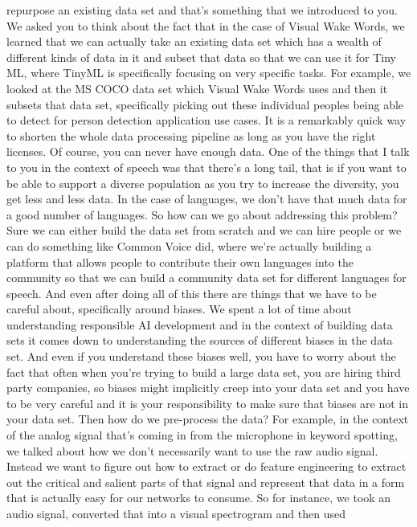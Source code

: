 repurpose an existing data set and that's
something that we introduced to you.
We asked you to think about the fact that in the case of Visual Wake Words,
we learned that we can actually take an existing data set which
has a wealth of different kinds of data in it
and subset that data so that we can use it
for Tiny ML, where TinyML is specifically
focusing on very specific tasks.
For example, we looked at the MS COCO data set which Visual Wake Words uses
and then it subsets that data set, specifically picking out
these individual peoples being able to detect for person detection application
use cases.
It is a remarkably quick way to shorten the whole data processing pipeline
as long as you have the right licenses.
Of course, you can never have enough data.
One of the things that I talk to you in the context of speech
was that there's a long tail, that is if you
want to be able to support a diverse population as you
try to increase the diversity, you get less and less data.
In the case of languages, we don't have that much data
for a good number of languages.
So how can we go about addressing this problem?
Sure we can either build the data set from scratch and we can hire people
or we can do something like Common Voice did, where we're actually
building a platform that allows people to contribute
their own languages into the community so
that we can build a community data set for different languages for speech.
And even after doing all of this there are
things that we have to be careful about, specifically around biases.
We spent a lot of time about understanding responsible AI
development and in the context of building
data sets it comes down to understanding the sources of different biases
in the data set.
And even if you understand these biases well, you have to worry about the fact
that often when you're trying to build a large data set,
you are hiring third party companies, so biases might implicitly
creep into your data set and you have to be very careful
and it is your responsibility to make sure that biases are not in your data
set.
Then how do we pre-process the data?
For example, in the context of the analog signal that's
coming in from the microphone in keyword spotting,
we talked about how we don't necessarily want to use the raw audio signal.
Instead we want to figure out how to extract or do feature engineering
to extract out the critical and salient parts of that signal
and represent that data in a form that is actually easy for our networks
to consume.
So for instance, we took an audio signal,
converted that into a visual spectrogram and then used
